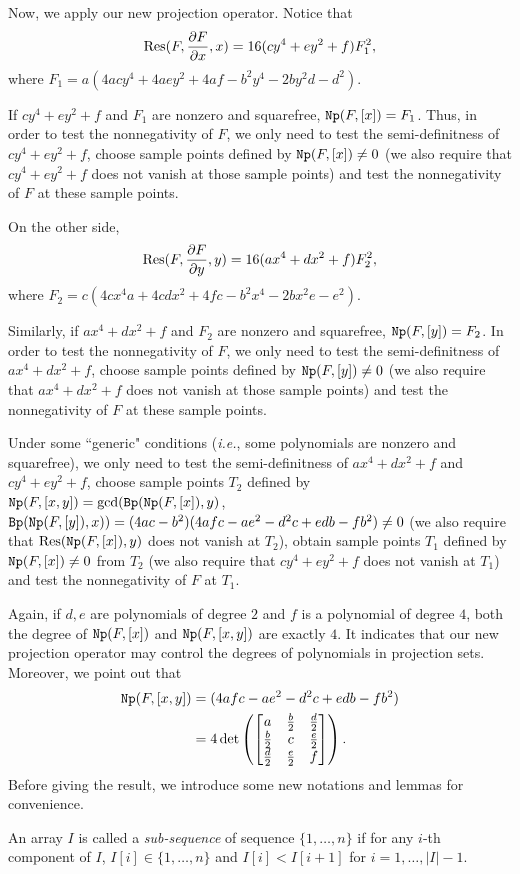 \documentclass[amsthm]{elsart}
\def \Res  {{\rm Res}}
\def \Bproj  {{\tt Bp}}
\def  \Nproj {{\tt Np}}
\begin{document}
Now, we apply our new projection operator. Notice that
$$\Res(F,\frac{\partial F }{\partial x}, x)=16(cy^4+ey^2+f)F_1^2,$$
where $F_1=a(4acy^4+4aey^2+4af-b^2y^4-2by^2d-d^2)$.

If $cy^4+ey^2+f$ and $F_1$ are nonzero and squarefree, $\Nproj(F,[x])=F_1$. Thus, in order to test the nonnegativity of $F$, we only need to test the semi-definitness of $cy^4+ey^2+f$, choose sample points defined by
$\Nproj(F,[x])\neq0$ (we also require that $cy^4+ey^2+f$ does not vanish at those sample points) and test the nonnegativity of $F$ at these sample points.

On the other side,
$$\Res(F, \frac{\partial F}{\partial y},y)=16(ax^4+dx^2+f)F_2^2,$$
where $F_2=c(4cx^4a+4cdx^2+4fc-b^2x^4-2bx^2e-e^2)$.

Similarly, if $ax^4+dx^2+f$ and $F_2$ are nonzero and squarefree, $\Nproj(F,[y])=F_2$. In order to test the nonnegativity of $F$, we only need to test the semi-definitness of $ax^4+dx^2+f$, choose sample points defined by
$\Nproj(F,[y])\neq0$ (we also require that $ax^4+dx^2+f$ does not vanish at those sample points) and test the nonnegativity of $F$ at these sample points.

Under some ``generic" conditions ({\it i.e.}, some polynomials are nonzero and squarefree), we only need to test the semi-definitness of $ax^4+dx^2+f$ and $cy^4+ey^2+f$, choose sample points $T_2$ defined by
$\Nproj(F,[x,y])=\gcd(\Bproj(\Nproj(F,[x]),y)$, $\Bproj(\Nproj(F,[y]),x))=(4ac-b^2)(4afc-ae^2-d^2c+edb-fb^2)\neq0$ (we also require that $\Res(\Nproj(F,[x]),y)$ does not vanish at $T_2$), obtain sample points $T_1$ defined by
 $\Nproj(F,[x])\neq0$ from $T_2$ (we also require that $cy^4+ey^2+f$ does not vanish at $T_1$)
 and test the nonnegativity of $F$ at $T_1$.

Again, if $d,e$ are polynomials of degree $2$ and $f$ is a polynomial of degree $4$, both the degree of $\Nproj(F,[x])$ and $\Nproj(F,[x,y])$ are exactly $4$. It indicates that our new projection operator may control the degrees of polynomials in projection sets. Moreover, we point out that
\begin{align*}
  \Nproj(F,[x,y])&=(4afc-ae^2-d^2c+edb-fb^2)\\
  &=4 \det\left( \begin{bmatrix} a & \frac{b}{2} &\frac{d}{2}\\ \frac{b}{2} & c &\frac{e}{2}\\
      \frac{d}{2}&\frac{e}{2}&f\end{bmatrix}\right).
\end{align*}
Before giving the result, we introduce some new notations and lemmas for convenience.
\begin{defn}
  An array $I$ is called a {\em sub-sequence} of sequence $\{1,\dots,n\}$ if for any $i$-th component of $I$, $I[i]\in \{1,\dots, n\} $ and $I[i]< I[i+1]$ for $i=1,\dots,|I|-1$. \end{defn}
\end{document}
